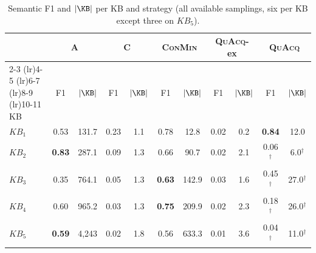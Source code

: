 \begin{table}[t]
\centering
\small
\setlength{\tabcolsep}{4pt}
\begin{tabular}{lcccccccccc}
\toprule
 & \multicolumn{2}{c}{A} & \multicolumn{2}{c}{C} & \multicolumn{2}{c}{\textsc{ConMin}} & \multicolumn{2}{c}{\textsc{QuAcq}-ex} & \multicolumn{2}{c}{\textsc{QuAcq}} \tabularnewline
\cmidrule(lr){2-3} \cmidrule(lr){4-5} \cmidrule(lr){6-7} \cmidrule(lr){8-9} \cmidrule(lr){10-11}
KB & F1 & $|\KB|$ & F1 & $|\KB|$ & F1 & $|\KB|$ & F1 & $|\KB|$ & F1 & $|\KB|$ \tabularnewline
\midrule
$KB_{1}$ & 0.53 & 131.7 & 0.23 & 1.1 & 0.78 & 12.8 & 0.02 & 0.2 & \textbf{0.84} & 12.0 \tabularnewline
$KB_{2}$ & \textbf{0.83} & 287.1 & 0.09 & 1.3 & 0.66 & 90.7 & 0.02 & 2.1 & 0.06$^{\dagger}$ & 6.0$^{\dagger}$ \tabularnewline
$KB_{3}$ & 0.35 & 764.1 & 0.05 & 1.3 & \textbf{0.63} & 142.9 & 0.03 & 1.6 & 0.45$^{\dagger}$ & 27.0$^{\dagger}$ \tabularnewline
$KB_{4}$ & 0.60 & 965.2 & 0.03 & 1.3 & \textbf{0.75} & 209.9 & 0.02 & 2.3 & 0.18$^{\dagger}$ & 26.0$^{\dagger}$ \tabularnewline
$KB_{5}$ & \textbf{0.59} & 4,243 & 0.02 & 1.8 & 0.56 & 633.3 & 0.01 & 3.6 & 0.04$^{\dagger}$ & 11.0$^{\dagger}$ \tabularnewline
\bottomrule
\end{tabular}
\caption{Semantic F1 and $|\KB|$ per KB and strategy (all available samplings, six per KB except three on $KB_{5}$).}
\label{tab:app-perset}
\end{table}
